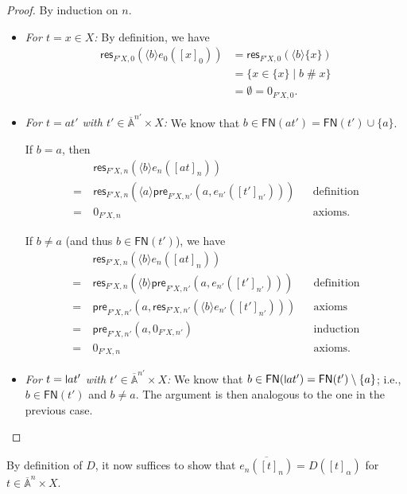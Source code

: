 \documentclass[a4paper,UKenglish,cleveref,thm-restate,numberwithinsect,final]{lipics-v2021}
\newcommand{\pre}{\mathsf{pre}}
\newcommand{\res}{\mathsf{res}}
\newcommand{\FN}{\mathsf{FN}}
\newcommand{\Names}{\mathbb{A}}
\newcommand{\barNames}{\overline{\Names}}
\newcommand{\fresh}{\mathbin{\#}}
\newcommand{\bind}[1]{\langle #1\rangle}
\theoremstyle{plain}
\newcommand{\midmid}{\hspace{0.2ex}{\rule[-0.1ex]{0.6pt}{1.65ex}}\hspace{0.2ex}}
\newcommand{\newletter}[1]{{\midmid}#1}
\numberwithin{equation}{section}
\newcommand{\+}[1]{\mathcal{#1}\xspace}
\theoremstyle{definition}
\begin{document}
\begin{proof}
  By induction on \(n\).
  \begin{itemize}
    \item \emph{For \(t = x \in X\):}
      By definition, we have
      \begin{align*}
        \res_{F'X, 0}(\bind{b} e_0([x]_0))
        &= \res_{F'X, 0}(\bind{b} \{x\}) \\
        &= \{x \in \{x\} \mid b \fresh x\} \\
        &= \emptyset = 0_{F'X, 0}.
      \end{align*}
    \item \emph{For \(t = at'\) with \(t' \in \barNames^{n'} \times X\):}
      We know that \(b \in \FN(at') = \FN(t') \cup \{a\}\).

      If \(b = a\), then
      \begin{align*}
        &\res_{F'X, n}(\bind{b} e_n([at]_n)) \\
        =~&\res_{F'X, n}(\bind{a} \pre_{F'X, n'}(a, e_{n'}([t']_{n'}))) && \text{definition} \\
        =~&0_{F'X, n} && \text{axioms}.
      \end{align*}

      If \(b \neq a\) (and thus \(b \in \FN(t')\)), we have
      \begin{align*}
        &\res_{F'X, n}(\bind{b} e_n([at]_n)) \\
        =~&\res_{F'X, n}(\bind{b} \pre_{F'X, n'}(a, e_{n'}([t']_{n'}))) && \text{definition} \\
        =~&\pre_{F'X, n'}(a, \res_{F'X, n'}(\bind{b} e_{n'}([t']_{n'}))) && \text{axioms} \\
        =~&\pre_{F'X, n'}(a, 0_{F'X, n'}) && \text{induction} \\
        =~&0_{F'X, n} && \text{axioms}.
      \end{align*}
    \item \emph{For \(t = \newletter{a}t'\) with \(t' \in \barNames^{n'} \times X\):}
      We know that \(b \in \FN(\newletter{a}t') = \FN(t') \setminus \{a\}\); i.e., \(b \in \FN(t')\) and \(b \neq a\).
      The argument is then analogous to the one in the previous case.
  \end{itemize}
\end{proof}

\noindent By definition of \(D\), it now suffices to show that \(\overline{e_n([t]_n)} = D([t]_\alpha)\) for \(t \in \barNames^n \times X\).
\end{document}
